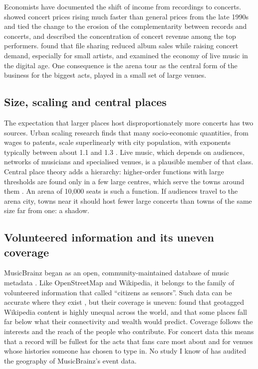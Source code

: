 \documentclass[11pt,a4paper]{article}
\begin{document}
Economists have documented the shift of income from recordings to concerts. \citet{krueger2005} showed concert prices rising much faster than general prices from the late 1990s and tied the change to the erosion of the complementarity between records and concerts, and \citet{connolly2006} described the concentration of concert revenue among the top performers. \citet{mortimer2012} found that file sharing reduced album sales while raising concert demand, especially for small artists, and \citet{holt2010} examined the economy of live music in the digital age. One consequence is the arena tour as the central form of the business for the biggest acts, played in a small set of large venues.

\subsection{Size, scaling and central places}
The expectation that larger places host disproportionately more concerts has two sources. Urban scaling research finds that many socio-economic quantities, from wages to patents, scale superlinearly with city population, with exponents typically between about 1.1 and 1.3 \citep{bettencourt2007,bettencourt2013}. Live music, which depends on audiences, networks of musicians and specialised venues, is a plausible member of that class. Central place theory adds a hierarchy: higher-order functions with large thresholds are found only in a few large centres, which serve the towns around them \citep{christaller1966}. An arena of 10,000 seats is such a function. If audiences travel to the arena city, towns near it should host fewer large concerts than towns of the same size far from one: a shadow.

\subsection{Volunteered information and its uneven coverage}
MusicBrainz began as an open, community-maintained database of music metadata \citep{swartz2002}. Like OpenStreetMap and Wikipedia, it belongs to the family of volunteered information that \citet{goodchild2007} called ``citizens as sensors''. Such data can be accurate where they exist \citep{haklay2010}, but their coverage is uneven: \citet{graham2014} found that geotagged Wikipedia content is highly unequal across the world, and that some places fall far below what their connectivity and wealth would predict. Coverage follows the interests and the reach of the people who contribute. For concert data this means that a record will be fullest for the acts that fans care most about and for venues whose histories someone has chosen to type in. No study I know of has audited the geography of MusicBrainz's event data.
\end{document}
